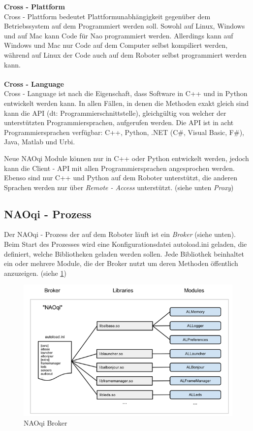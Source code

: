\textbf{Cross - Plattform}
\\
Cross - Plattform bedeutet Plattformunabhängigkeit gegenüber dem Betriebssystem auf dem Programmiert werden soll. Sowohl auf Linux, Windows und auf Mac kann Code für Nao programmiert werden. Allerdings kann auf Windows und Mac nur Code auf dem Computer selbst kompiliert werden, während auf Linux der Code auch auf dem Roboter selbst programmiert werden kann.
\\
\\
\textbf{Cross - Language}
\\	
Cross - Language ist nach \cite{ws:naodocu} die Eigenschaft, dass Software in C++ und in Python entwickelt werden kann. In allen Fällen, in denen die Methoden exakt gleich sind kann die \ac{API} (dt: Programmierschnittstelle), gleichgültig von welcher der unterstützten Programmiersprachen, aufgerufen werden. Die \ac{API} ist in acht Programmiersprachen verfügbar: C++, Python, .NET (C\#, Visual Basic, F\#), Java, Matlab und Urbi.

Neue NAOqi Module können nur in C++ oder Python entwickelt werden, jedoch kann die Client - API mit allen Programmiersprachen angesprochen werden. Ebenso sind nur C++ und Python auf dem Roboter unterstützt, die anderen Sprachen werden nur über \textit{Remote - Access} unterstützt. (siehe unten \textit{Proxy})
\\
\subsection{NAOqi - Prozess}
Der NAOqi - Prozess der auf dem Roboter läuft ist ein \textit{Broker} (siehe unten). Beim Start des Prozesses wird eine Konfigurationsdatei \textsf{autoload.ini} geladen, die definiert, welche Bibliotheken geladen werden sollen. Jede Bibliothek beinhaltet ein oder mehrere Module, die der Broker nutzt um deren Methoden öffentlich anzuzeigen. (siehe \ref{f:naoqi_broker1})

\begin{figure}[H]						
	\centering							
	\includegraphics[scale=0.8]{Bilder/naoqi_process1.PNG}
	\caption{NAOqi Broker}						
	\label{f:naoqi_broker1}						
\end{figure}


